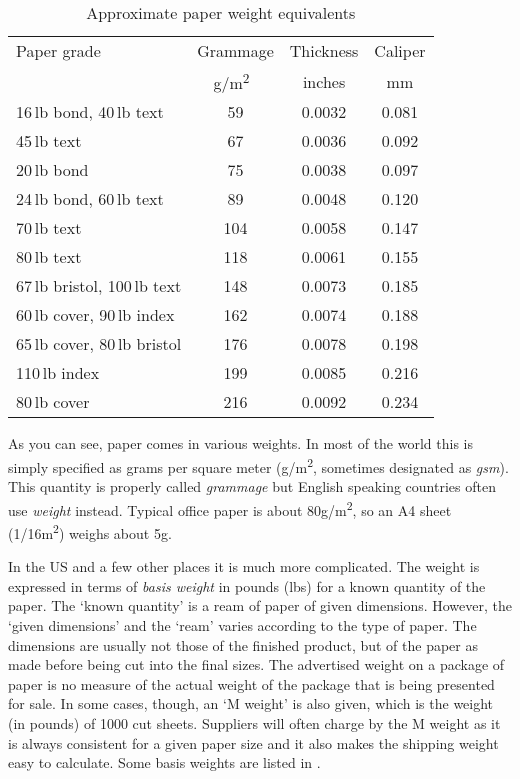 \documentclass[10pt,letterpaper,extrafontsizes]{memoir}
\newcommand*{\sqrd}[1]{#1\textsuperscript{2}}
\newcommand*{\gsm}{g/\sqrd{m}}
\newcommand\U[2]{\textrm{#1}\,\textrm{#2}}
\begin{document}
\begin{table}
\centering
\caption{Approximate paper weight equivalents}\label{tab:weightequivs}
\begin{tabular}{lccc} \toprule
Paper grade & Grammage & Thickness &  Caliper \\ 
            & \gsm\    & inches    & mm       \\ \midrule
\U{16}{lb} bond, \U{40}{lb} text     & 59  & 0.0032 & 0.081 \\
\U{45}{lb} text                  & 67  & 0.0036 & 0.092 \\
\U{20}{lb} bond                  & 75  & 0.0038 & 0.097 \\
\U{24}{lb} bond, \U{60}{lb} text     & 89  & 0.0048 & 0.120 \\
\U{70}{lb} text                  & 104 & 0.0058 & 0.147  \\
\U{80}{lb} text                  & 118 & 0.0061 & 0.155 \\
\U{67}{lb} bristol, \U{100}{lb} text & 148 & 0.0073 & 0.185 \\
\U{60}{lb} cover, \U{90}{lb} index   & 162 & 0.0074 & 0.188 \\
\U{65}{lb} cover, \U{80}{lb} bristol & 176 & 0.0078 & 0.198 \\
\U{110}{lb} index                & 199 & 0.0085 & 0.216 \\
\U{80}{lb} cover                 & 216 & 0.0092 & 0.234 \\
\bottomrule
\end{tabular}
\end{table}

    As you can see, paper comes in various weights. In most of the world this
is simply specified as grams per square meter (\gsm, sometimes designated as
\emph{gsm}). This quantity is properly called \emph{grammage}
but English
speaking countries often use \emph{weight} instead. Typical office
paper is about 80\gsm, so an A4 sheet (1/16\sqrd{m}) weighs about 5g.

    In the US and a few other places it is much more complicated. The
weight is expressed in terms of \emph{basis weight} 
in pounds (lbs) for a known quantity of the
paper. The `known quantity' is a ream of paper of given dimensions. However, 
the `given dimensions' and the `ream' varies according to the type of paper.
The dimensions are usually not those of the finished product, but of the paper
as made before being cut into the final sizes. 
The advertised weight on a package of paper is no measure of the actual 
weight of the package that is being presented for sale. 
In some cases, though, an `M weight' is also given, 
which is the weight (in
pounds) of 1000 cut sheets. Suppliers will often charge by the M weight as it
is always consistent for a given paper size and it also makes the shipping
weight easy to calculate. Some basis weights
are listed in .
\end{document}
